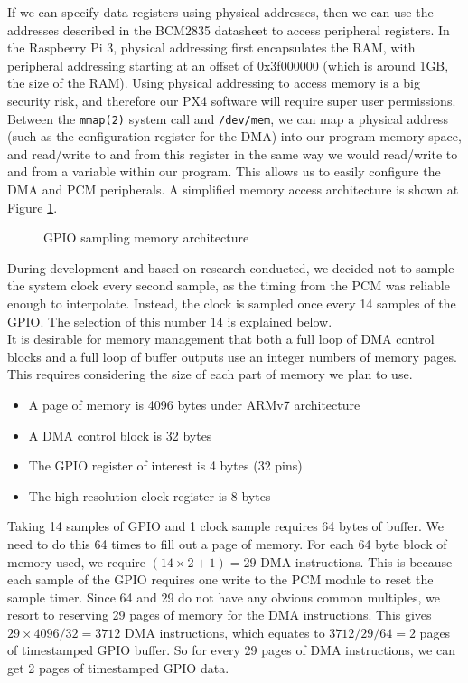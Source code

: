 \documentclass[capstone_report.tex]{subfiles}
\begin{document}
    If we can specify data registers using physical addresses, then we can use the addresses described in the BCM2835 datasheet to access peripheral registers. In the Raspberry Pi 3, physical addressing first encapsulates the RAM, with peripheral addressing starting at an offset of 0x3f000000 (which is around 1GB, the size of the RAM). Using physical addressing to access memory is a big security risk, and therefore our PX4 software will require super user permissions. \\

    Between the \texttt{mmap(2)} system call and \texttt{/dev/mem}, we can map a physical address (such as the configuration register for the DMA) into our program memory space, and read/write to and from this register in the same way we would read/write to and from a variable within our program. This allows us to easily configure the DMA and PCM peripherals. A simplified memory access architecture is shown at Figure \ref{fig:dma2}.

    \begin{figure}[H]
    \centering
        
        \caption{GPIO sampling memory architecture\label{fig:dma2}}
    \end{figure}

    During development and based on research conducted, we decided not to sample the system clock every second sample, as the timing from the PCM was reliable enough to interpolate. Instead, the clock is sampled once every 14 samples of the GPIO. The selection of this number 14 is explained below. \\

    It is desirable for memory management that both a full loop of DMA control blocks and a full loop of buffer outputs use an integer numbers of memory pages. This requires considering the size of each part of memory we plan to use.

    \begin{itemize}
        \item A page of memory is 4096 bytes under ARMv7 architecture
        \item A DMA control block is 32 bytes
        \item The GPIO register of interest is 4 bytes (32 pins)
        \item The high resolution clock register is 8 bytes
    \end{itemize}

    Taking 14 samples of GPIO and 1 clock sample requires 64 bytes of buffer. We need to do this 64 times to fill out a page of memory. For each 64 byte block of memory used, we require $(14\times2+1) = 29$ DMA instructions. This is because each sample of the GPIO requires one write to the PCM module to reset the sample timer. Since 64 and 29 do not have any obvious common multiples, we resort to reserving 29 pages of memory for the DMA instructions. This gives $29\times 4096 / 32 = 3712$ DMA instructions, which equates to $3712/29/64=2$ pages of timestamped GPIO buffer. So for every 29 pages of DMA instructions, we can get 2 pages of timestamped GPIO data. \\
\end{document}
